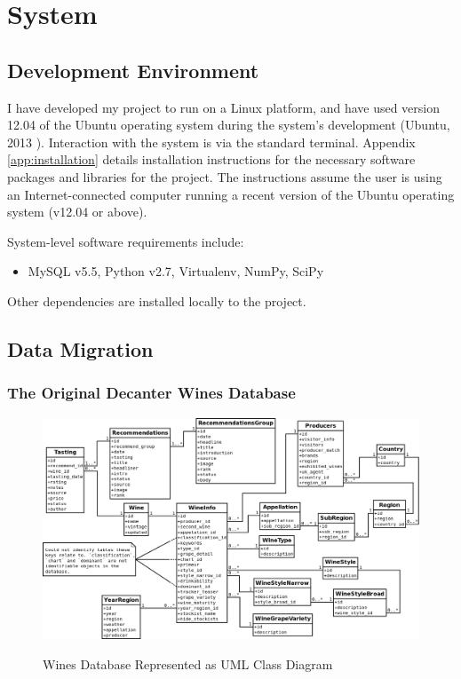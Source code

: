 \section{System}\label{design}

\subsection{Development Environment}

I have developed my project to run on a Linux platform, and have used version 12.04 of the Ubuntu operating system during the system's development (Ubuntu, 2013 \cite{Ubuntu12LTS}). Interaction with the system is via the standard terminal. Appendix \ref{app:installation} details installation instructions for the necessary software packages and libraries for the project. The instructions assume the user is using an Internet-connected computer running a recent version of the Ubuntu operating system (v12.04 or above).

System-level software requirements include:

\begin{itemize}
    \item MySQL v5.5, Python v2.7, Virtualenv, NumPy, SciPy
\end{itemize}

Other dependencies are installed locally to the project.

\subsection{Data Migration}

\subsubsection{The Original Decanter Wines Database}

\begin{figure}[h!]
    \caption{Wines Database Represented as UML Class Diagram}
    \centering
        \includegraphics[width=14cm]{DecanterWineDB}
    \label{fig:decanterdb}
\end{figure}

